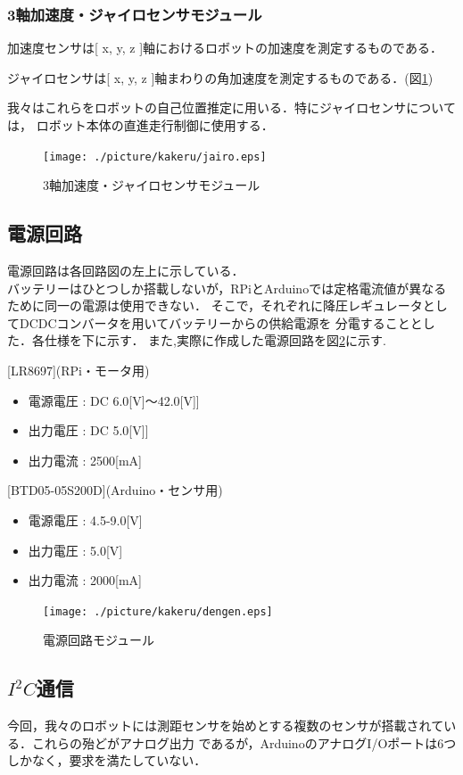 \documentclass[11pt,a4]{jsarticle}
\begin{document}
\subsubsection{3軸加速度・ジャイロセンサモジュール}
加速度センサは[ x, y, z ]軸におけるロボットの加速度を測定するものである．

ジャイロセンサは[ x, y, z ]軸まわりの角加速度を測定するものである．(図\ref{jairo})

我々はこれらをロボットの自己位置推定に用いる．特にジャイロセンサについては，
ロボット本体の直進走行制御に使用する．
\begin{figure}[t]
 \centering
 \texttt{[image: ./picture/kakeru/jairo.eps]}
    \caption{3軸加速度・ジャイロセンサモジュール}
    \label{jairo}
\end{figure}
\subsection{電源回路}
電源回路は各回路図の左上に示している．\\
バッテリーはひとつしか搭載しないが，RPiとArduinoでは定格電流値が異なるために同一の電源は使用できない．
そこで，それぞれに降圧レギュレータとしてDCDCコンバータを用いてバッテリーからの供給電源を
分電することとした．各仕様を下に示す．
また,実際に作成した電源回路を図\ref{dengen}に示す.

[LR8697](RPi・モータ用)
\begin{itemize}
 \item 電源電圧 : DC 6.0[V]$〜$42.0[V]]
 \item 出力電圧 : DC 5.0[V]]
 \item 出力電流 : 2500[mA]
\end{itemize}

[BTD05-05S200D](Arduino・センサ用)
\begin{itemize}
 \item 電源電圧 : 4.5-9.0[V]
 \item 出力電圧 : 5.0[V]
 \item 出力電流 : 2000[mA]
\end{itemize}
\begin{figure}[t]
 \centering
 \texttt{[image: ./picture/kakeru/dengen.eps]}
    \caption{電源回路モジュール}
    \label{dengen}
\end{figure}
\newpage
\subsection{$I^2 C$通信}
今回，我々のロボットには測距センサを始めとする複数のセンサが搭載されている．これらの殆どがアナログ出力
であるが，ArduinoのアナログI/Oポートは6つしかなく，要求を満たしていない．
\end{document}

